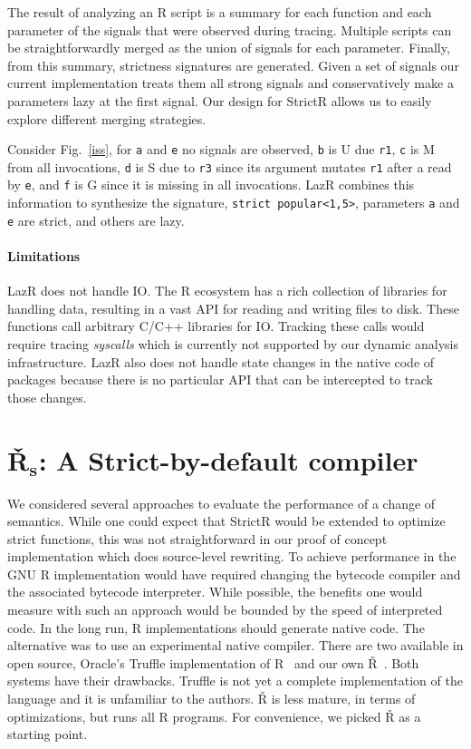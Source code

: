 \documentclass[review,creen,acmsmall]{acmart}
\renewcommand{\c}[1]{\lstinline |#1|\xspace}
\newcommand{\strictr}{{\sf StrictR}\xspace}
\newcommand{\lazr}{{\sf LazR}\xspace}
\renewcommand{\Rsh}{{\sf\v R}\xspace}
\begin{document}
The result of analyzing an R script is a summary for each function and each
parameter of the signals that were observed during tracing. Multiple scripts can
be straightforwardly merged as the union of signals for each parameter. Finally,
from this summary, strictness signatures are generated. Given a set of signals
our current implementation treats them all strong signals and conservatively
make a parameters lazy at the first signal. Our design for \strictr allows us to
easily explore different merging strategies.


Consider Fig.~\ref{iss}, for \c a and \c e no signals are observed, \c b is U
due \c{r1}, \c c is M from all invocations, \c d is S due to \c{r3} since its
argument mutates \c{r1} after a read by \c e, and \c f is G since it is missing
in all invocations. \lazr combines this information to synthesize the signature,
\texttt{strict popular<1,5>}, parameters \c a and \c e are strict, and others
are lazy.


\paragraph{Limitations}
\lazr does not handle IO. The R ecosystem has a rich collection of libraries for
handling data, resulting in a vast API for reading and writing files to disk.
These functions call arbitrary C/C++ libraries for IO. Tracking these calls
would require tracing \emph{syscalls} which is currently not supported by our
dynamic analysis infrastructure. \lazr also does not handle state changes in the
native code of packages because there is no particular API that can be
intercepted to track those changes.

\section{\v R$_{\mathbf s}$: A Strict-by-default compiler}\label{sec:rsh1}

We considered several approaches to evaluate the performance of a change of
semantics. While one could expect that \strictr would be extended to optimize
strict functions, this was not straightforward in our proof of concept
implementation which does source-level rewriting. To achieve performance in the
GNU R implementation would have required changing the bytecode compiler and the
associated bytecode interpreter. While possible, the benefits one would measure
with such an approach would be bounded by the speed of interpreted code. In the long
run, R implementations should generate native code. The alternative was to use
an experimental native compiler. There are two available in open source,
Oracle's Truffle implementation of R~\cite{Stadler16} and our own
\Rsh~\cite{dls19}. Both systems have their drawbacks. Truffle is not yet a
complete implementation of the language and it is unfamiliar to the authors.
\Rsh is less mature, in terms of optimizations, but runs all R programs. For
convenience, we picked \Rsh as a starting point.
\end{document}
